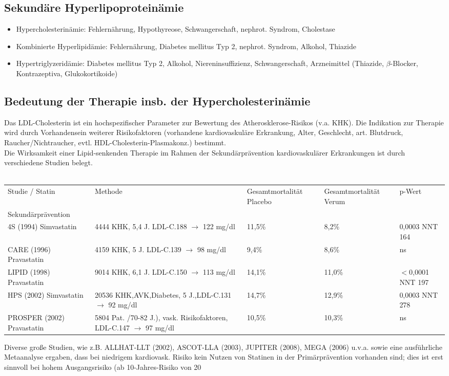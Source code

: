 \documentclass[10pt,a4paper]{report}
\begin{document}
\subsection{Sekundäre Hyperlipoproteinämie}
\label{ssub:sekund_re_h}
\begin{itemize}
	\item Hypercholesterinämie:  Fehlernährung, Hypothyreose,	Schwangerschaft, nephrot. Syndrom, Cholestase				
	\item Kombinierte Hyperlipidämie: Fehlernährung, Diabetes mellitus Typ 2, nephrot. Syndrom, Alkohol, Thiazide			
	\item Hypertriglyzeridämie: Diabetes mellitus Typ 2, Alkohol, Niereninsuffizienz, Schwangerschaft, Arzneimittel (Thiazide, $\beta$-Blocker, Kontrazeptiva, Glukokortikoide) 
\end{itemize}
\subsection{Bedeutung der Therapie insb. der Hypercholesterinämie} %
\label{ssub:bedeutung_der_therapie_insb_der_hypercholesterin_mie}
Das LDL-Cholesterin ist ein hochspezifischer Parameter zur Bewertung des Atherosklerose-Risikos (v.a. KHK). Die Indikation zur Therapie wird durch Vorhandensein weiterer Risikofaktoren (vorhandene kardiovaskuläre Erkrankung, Alter, Geschlecht, art. Blutdruck, Raucher/Nichtraucher, evtl. HDL-Cholesterin-Plasmakonz.) bestimmt. \\
Die Wirksamkeit einer Lipid-senkenden Therapie im Rahmen der Sekundärprävention kardiovaskulärer Erkrankungen ist durch verschiedene Studien belegt. \\ \\
\begin{tabularx}{\textwidth}{XXXXX}
Studie / Statin&Methode&Gesamtmortalität Placebo&Gesamtmortalität Verum&p-Wert\\
Sekundärprävention&&&&\\
4S (1994) Simvastatin&4444 KHK, 5,4 J. LDL-C.188 $\rightarrow$ 122 mg/dl&11,5\%&8,2\%&0,0003 NNT 164\\
CARE (1996) Pravastatin&4159 KHK, 5 J. LDL-C.139 $\rightarrow$ 98 mg/dl&9,4\%&8,6\%&ns\\
LIPID (1998) Pravastatin&9014 KHK, 6,1 J. LDL-C.150 $\rightarrow$ 113 mg/dl&14,1\%&11,0\%&$<$0,0001 NNT 197\\
HPS (2002) Simvastatin&20536 KHK,AVK,Diabetes, 5 J.,LDL-C.131 $\rightarrow$ 92 mg/dl&14,7\%&12,9\%&0,0003 NNT 278\\
PROSPER (2002) Pravastatin&5804 Pat. /70-82 J.), vask. Risikofaktoren, LDL-C.147 $\rightarrow$ 97 mg/dl&10,5\%&10,3\%&ns\\
\end{tabularx}
Diverse große Studien, wie z.B. ALLHAT-LLT (2002), ASCOT-LLA (2003), JUPITER (2008), MEGA (2006) u.v.a. sowie eine ausführliche Metaanalyse ergaben, dass bei niedrigem kardiovask. Risiko kein Nutzen von Statinen in der Primärprävention vorhanden sind; dies ist erst sinnvoll bei hohem Ausgangsrisiko (ab 10-Jahres-Risiko von 20%
\end{document}
